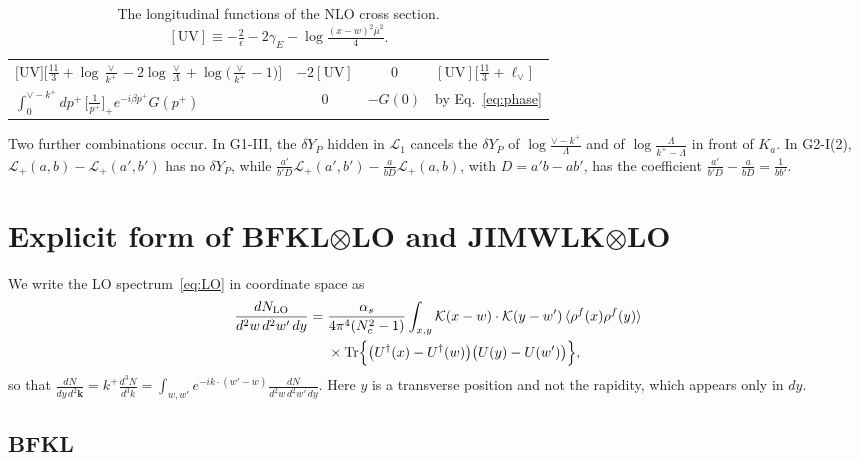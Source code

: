 \documentclass[aps,prd,onecolumn,superscriptaddress,nofootinbib,floatfix,longbibliography,11pt]{revtex4-2}
\numberwithin{equation}{section}
\newcommand{\KK}{\mathcal{K}}
\newcommand{\Ud}{U^{\dagger}}
\newcommand{\Tr}{\mathrm{Tr}}
\newcommand{\lV}{\ell_{\vee}}
\newcommand{\Lp}{\mathcal{L}_{+}}
\newcommand{\Lo}{\mathcal{L}_{1}}
\begin{document}
\begin{table}[!htbp]
\begin{tabular}{p{6.0cm}ccp{6.4cm}}
$\big[\mathrm{UV}\big]\big[\frac{11}{3}+\log\frac{\vee}{k^+}-2\log\frac{\vee}{\Lambda}+\log\big(\frac{\vee}{k^+}-1\big)\big]$ & $-2[\mathrm{UV}]$ & 0 & $[\mathrm{UV}]\big[\frac{11}{3}+\lV\big]$\\
$\int_0^{\vee-k^+}dp^+\,\big[\frac{1}{p^+}\big]_+e^{-i\beta p^+}G(p^+)$ & 0 & $-G(0)$ & by Eq.~\eqref{eq:phase}\\
\bottomrule
\end{tabular}
\caption{The longitudinal functions of the NLO cross section. $[\mathrm{UV}]\equiv-\frac2\epsilon-2\gamma_E-\log\frac{(x-w)^2\bar\mu^2}{4}$.}
\label{tab:L}
\end{table}

Two further combinations occur. In G1-III, the $\delta Y_P$ hidden in $\Lo$ cancels the $\delta Y_P$ of $\log\frac{\vee-k^+}{\Lambda}$ and of $\log\frac{\Lambda}{k^+-\Lambda}$ in front of $K_a$. In G2-I(2), $\Lp(a,b)-\Lp(a',b')$ has no $\delta Y_P$, while $\frac{a'}{b'D}\Lp(a',b')-\frac{a}{bD}\Lp(a,b)$, with $D=a'b-ab'$, has the coefficient $\frac{a'}{b'D}-\frac{a}{bD}=\frac{1}{bb'}$.
\section{Explicit form of BFKL\texorpdfstring{$\otimes$}{x}LO and JIMWLK\texorpdfstring{$\otimes$}{x}LO}\label{app:explicit}

We write the LO spectrum~\eqref{eq:LO} in coordinate space as
\begin{align}
\frac{dN_{\rm LO}}{d^2w\,d^2w'\,dy}={}&\frac{\alpha_s}{4\pi^4(N_c^2-1)}\int_{x,y}\KK(x-w)\cdot\KK(y-w')\,\langle\rho^f(x)\rho^f(y)\rangle\notag\\
&\times\Tr\Big\{\big(\Ud(x)-\Ud(w)\big)\big(U(y)-U(w')\big)\Big\},
\label{eq:LOx}
\end{align}
so that $\frac{dN}{dy\,d^2\mathbf k}=k^+\frac{d^3N}{d^3k}=\int_{w,w'}e^{-ik\cdot(w'-w)}\frac{dN}{d^2w\,d^2w'\,dy}$. Here $y$ is a transverse position and not the rapidity, which appears only in $dy$.

\subsection{BFKL}
\end{document}
